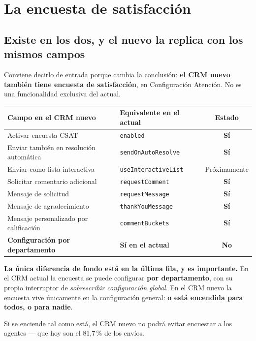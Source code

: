 \documentclass[11pt,a4paper]{article}
\newcommand{\cod}[1]{\texttt{\small #1}}
\newcommand{\si}{\textcolor{ok}{\textbf{Sí}}}
\newcommand{\no}{\textcolor{warn}{\textbf{No}}}
\begin{document}
\section{La encuesta de satisfacción}
\label{sec:csat}

\subsection{Existe en los dos, y el nuevo la replica con los mismos campos}

Conviene decirlo de entrada porque cambia la conclusión: \textbf{el CRM nuevo también
tiene encuesta de satisfacción}, en Configuración \textrightarrow{} Atención. No es una
funcionalidad exclusiva del actual.

\begin{center}
\begin{tabularx}{\textwidth}{@{}LLc@{}}
\toprule
\textbf{Campo en el CRM nuevo} & \textbf{Equivalente en el actual} & \textbf{Estado} \\
\midrule
Activar encuesta CSAT                    & \cod{enabled}            & \si \\
Enviar también en resolución automática  & \cod{sendOnAutoResolve}  & \si \\
Enviar como lista interactiva            & \cod{useInteractiveList} & Próximamente \\
Solicitar comentario adicional           & \cod{requestComment}     & \si \\
Mensaje de solicitud                     & \cod{requestMessage}     & \si \\
Mensaje de agradecimiento                & \cod{thankYouMessage}    & \si \\
Mensaje personalizado por calificación   & \cod{commentBuckets}     & \si \\
\midrule
\textbf{Configuración por departamento}  & \textbf{Sí en el actual} & \no \\
\bottomrule
\end{tabularx}
\end{center}

\begin{alerta}
\textbf{La única diferencia de fondo está en la última fila, y es importante.} En el CRM
actual la encuesta se puede configurar \textbf{por departamento}, con su propio
interruptor de \emph{sobrescribir configuración global}. En el CRM nuevo la encuesta vive
únicamente en la configuración general: \textbf{o está encendida para todos, o para
nadie}.

\vspace{0.4em}
Si se enciende tal como está, el CRM nuevo no podrá evitar encuestar a los agentes ---
que hoy son el 81,7\,\% de los envíos.
\end{alerta}
\end{document}
